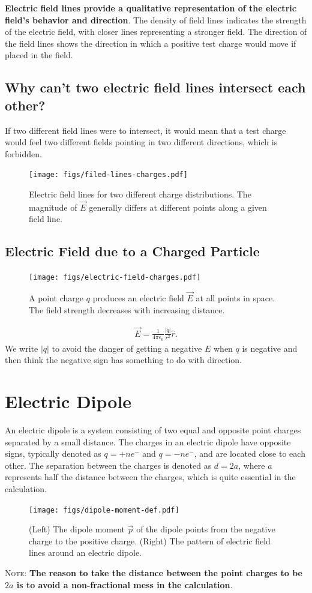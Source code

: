 \documentclass[12pt,b4paper]{article}
\begin{document}
\textbf{Electric field lines provide a qualitative representation of the electric field's behavior and direction}. The density of field lines indicates the strength of the electric field, with closer lines representing a stronger field. The direction of the field lines shows the direction in which a positive test charge would move if placed in the field.

\subsection*{Why can't two electric field lines intersect each other?}
If two different field lines were to intersect, it would mean that a test charge would feel two different fields pointing in two different directions, which is forbidden.
\begin{figure}[H]
    \centering
    \texttt{[image: figs/filed-lines-charges.pdf]}
    \caption{Electric field lines for two different charge distributions. The magnitude of $\vec{E}$ generally differs at different points along a given field line.}
    \label{fig:electric-field-lines}
\end{figure}
\subsection{Electric Field due to a Charged Particle}
\begin{figure}[H]
    \centering
    \texttt{[image: figs/electric-field-charges.pdf]}
    \caption{A point charge $q$ produces an electric field $\vec{E}$ at all points in space. The field strength decreases with increasing distance.}
    \label{fig:electric-field-charges}
\end{figure}
\begin{align}
    \Vec{E}=\frac{1}{4\pi\epsilon_0}\frac{|q|}{r^2}\hat{r}.
\end{align}
We write $|q|$ to avoid the danger of getting a negative $E$ when $q$ is negative and then think the negative sign has something to do with direction.
\section{Electric Dipole}
An electric dipole is a system consisting of two equal and opposite point charges separated by a small distance. The charges in an electric dipole have opposite signs, typically denoted as $q=+ne^-$ and $q=-ne^-$, and are located close to each other. The separation between the charges is denoted as $d=2a$, where $a$ represents half the distance between the charges, which is quite essential in the calculation.
\begin{figure}[H]
    \centering
    \texttt{[image: figs/dipole-moment-def.pdf]}
    \caption{(Left) The dipole moment $\vec{p}$ of the dipole points from the negative charge to the positive charge. (Right) The pattern of electric field lines around an electric dipole.}
    \label{fig:dipole-moment-def}
\end{figure}
\textsc{Note}: \textbf{The reason to take the distance between the point charges to be $2a$ is to avoid a non-fractional mess in the calculation}.
\end{document}
